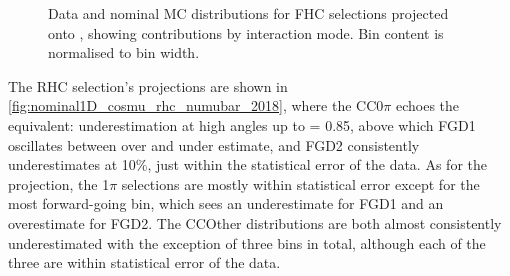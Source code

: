 \begin{figure}[h]
	\caption{Data and nominal MC distributions for FHC \numu selections projected onto \cosmu, showing contributions by interaction mode. Bin content is normalised to bin width.}
	\label{fig:nominal1D_cosmu_fhc_2018}
\end{figure}

The RHC \numubar selection's \cosmu projections are shown in \autoref{fig:nominal1D_cosmu_rhc_numubar_2018}, where the CC0$\pi$ echoes the \numu equivalent: underestimation at high angles up to \cosmu= 0.85, above which FGD1 oscillates between over and under estimate, and FGD2 consistently underestimates at 10\%, just within the statistical error of the data. As for the \pmu projection, the 1$\pi$ selections are mostly within statistical error except for the most forward-going bin, which sees an underestimate for FGD1 and an overestimate for FGD2. The CCOther distributions are both almost consistently underestimated with the exception of three bins in total, although each of the three are within statistical error of the data. 
